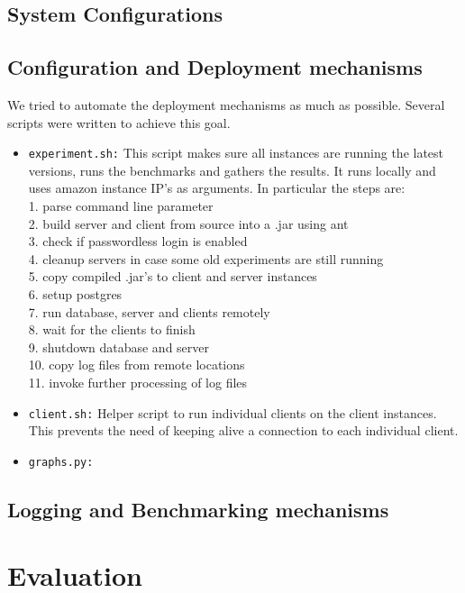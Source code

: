 \documentclass[11pt]{article}
\begin{document}
\subsection{System Configurations}\label{sec:system-configurations}

\subsection{Configuration and Deployment mechanisms}\label{sec:configuration-and-deployment-mechanisms}
We tried to automate the deployment mechanisms as much as possible. Several scripts were written to achieve this goal.
\begin{itemize}
  \item \texttt{experiment.sh:} This script makes sure all instances are running the latest versions, runs the benchmarks and gathers the results. It runs locally and uses amazon instance IP's as arguments. In particular the steps are: \\1. parse command line parameter \\2. build server and client from source into a .jar using ant \\3. check if passwordless login is enabled \\4. cleanup servers in case some old experiments are still running \\5. copy compiled .jar's to client and server instances \\6. setup postgres \\7. run database, server and clients remotely \\8. wait for the clients to finish \\9. shutdown database and server \\10. copy log files from remote locations \\11. invoke further processing of log files
  \item \texttt{client.sh:} Helper script to run individual clients on the client instances. This prevents the need of keeping alive a connection to each individual client.
  \item \texttt{graphs.py:} 
\end{itemize}
\subsection{Logging and Benchmarking mechanisms}\label{sec:logging-and-benchmarking-mechanisms}

\section{Evaluation}\label{sec:evaluation}
\end{document}
